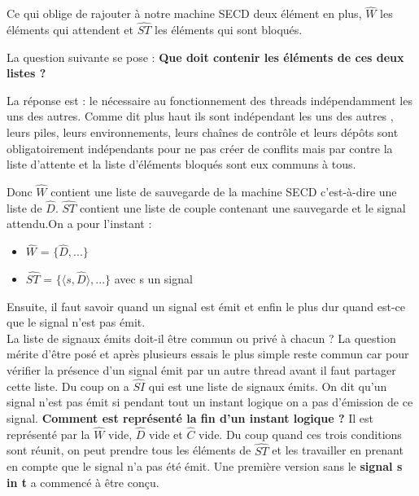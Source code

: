 \documentclass[10pt,a4paper]{article}
\begin{document}
		
		Ce qui oblige de rajouter à notre machine SECD deux élément en plus, $\widehat{W}$ les éléments qui attendent et $\widehat{ST}$ les éléments qui sont bloqués.
		\bigbreak
		
		
		La question suivante se pose : \textbf{Que doit contenir les éléments de ces deux listes ?}
		\smallbreak
		
		La réponse est : le nécessaire au fonctionnement des threads indépendamment les uns des autres. Comme dit plus haut ils sont indépendant les uns des autres , leurs piles, leurs environnements, leurs chaînes de contrôle et leurs dépôts sont obligatoirement indépendants pour ne pas créer de conflits mais par contre la liste d'attente et la liste d'éléments bloqués sont eux communs à tous.
		\medbreak
		
		Donc $\widehat{W}$ contient une liste de sauvegarde de la machine SECD c'est-à-dire une liste de $\widehat{D}$. $\widehat{ST}$ contient une liste de couple contenant une sauvegarde et le signal attendu.On a pour l'instant :
		
		\begin{itemize}
			\item[] $\widehat{W}$ = $\{\widehat{D},...\}$
			\item[] $\widehat{ST}$ = $\{\langle s,\widehat{D}\rangle,...\}$ avec s un signal 
		\end{itemize}
		
		Ensuite, il faut savoir quand un signal est émit et enfin le plus dur quand est-ce que le signal n'est pas émit.
		\\
		La liste de signaux émits doit-il être commun ou privé à chacun ? La question mérite d'être posé et après plusieurs essais le plus simple reste commun car pour vérifier la présence d'un signal émit par un autre thread avant il faut partager cette liste. Du coup on a $\widehat{SI}$ qui est une liste de signaux émits.
		\smallbreak
		On dit qu'un signal n'est pas émit si pendant tout un instant logique on a pas d'émission de ce signal. \textbf{Comment est représenté la fin d'un instant logique ?} Il est représenté par la $\widehat{W}$ vide, $\widehat{D}$ vide et $\widehat{C}$ vide. 
		\smallbreak
		Du coup quand ces trois conditions sont réunit, on peut prendre tous les éléments de $\widehat{ST}$ et les travailler en prenant en compte que le signal n'a pas été émit.
		\smallbreak
		Une première version sans le \textbf{signal s in t} a commencé à être conçu.
		\newpage
		
		
\end{document}
